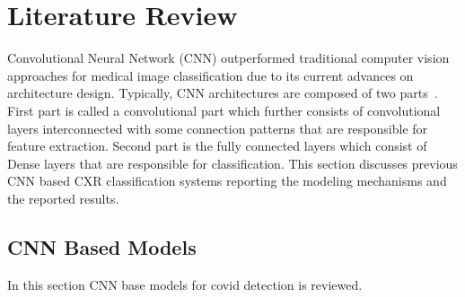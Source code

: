 
\chapter{Literature Review} %

\label{chp:related} %

Convolutional Neural Network (CNN) outperformed traditional computer vision approaches for medical image classification due to its current advances on architecture design. Typically, CNN architectures are composed of two parts~\cite{krizhevsky2012imagenet}. First part is called a convolutional part which further consists of  convolutional layers interconnected with some connection patterns that are responsible for feature extraction. Second part is the fully connected layers which consist of Dense layers that are responsible for classification. This section discusses previous CNN based CXR classification systems  reporting the modeling mechanisms and the reported results.
\section{CNN Based Models}
In this section CNN base models for covid detection is reviewed.
